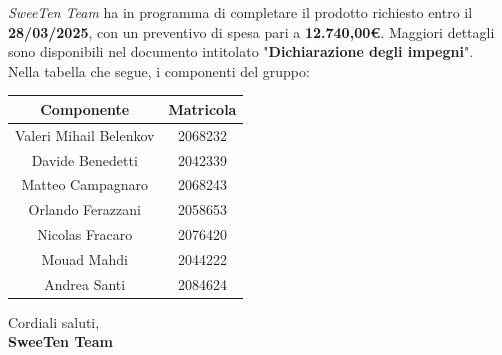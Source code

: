 \documentclass[italian, 11pt]{article}
\begin{document}
\textit{SweeTen Team} ha in programma di completare il prodotto richiesto entro il \textbf{28/03/2025}, con un preventivo di spesa pari a \textbf{12.740,00€}. Maggiori dettagli sono disponibili nel documento intitolato "\textbf{Dichiarazione degli impegni}".
\\Nella tabella che segue, i componenti del gruppo:
 \begin{table}[H]
    \centering
    \begin{tabular}{|c|c|}
        \hline
        \textbf{Componente} & \textbf{Matricola} \\
        \hline
        Valeri Mihail Belenkov & 2068232 \\
        Davide Benedetti 	& 2042339 \\
        Matteo Campagnaro	& 2068243 \\
        Orlando Ferazzani 	& 2058653 \\
        Nicolas Fracaro 	& 2076420 \\
        Mouad Mahdi		    & 2044222 \\ 
        Andrea Santi 	    & 2084624 \\
        \hline       
    \end{tabular}
\end{table}

Cordiali saluti, \\
\textbf{SweeTen Team}
\end{document}
